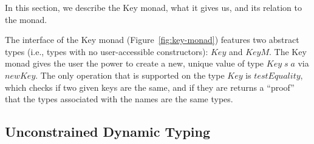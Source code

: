 \documentclass{sigplanconf}
\newcommand{\Conid}[1]{\mathit{#1}}
\newcommand{\Varid}[1]{\mathit{#1}}
\begin{document}
In this section, we describe the Key monad, what it gives us, and its relation to the \st{} monad.

The interface of the Key monad (Figure\ \ref{fig:key-monad}) features two abstract types (i.e., types with no user-accessible constructors): \ensuremath{\Conid{Key}} and \ensuremath{\Conid{KeyM}}. The Key monad gives the user the power to create a new, unique value of type \ensuremath{\Conid{Key}\;\Varid{s}\;\Varid{a}} via \ensuremath{\Varid{newKey}}. The only operation that is supported on the type \ensuremath{\Conid{Key}} is \ensuremath{\Varid{testEquality}}, which checks if two given keys are the same, and if they are returns a ``proof'' that the types associated with the names are the same types. 

\subsection{Unconstrained Dynamic Typing}
\end{document}
